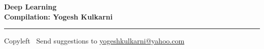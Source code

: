 
\graphicspath{{images/}}



\footnotesize


\begin{center}
\Large{\textbf{Deep Learning\\ Compilation: Yogesh Kulkarni}}  
\end{center}

\begin{multicols}{2}

\end{multicols}

\rule{\linewidth}{0.25pt}
\scriptsize
Copyleft \textcopyleft\  Send suggestions to 
\href{http://www.yogeshkulkarni.com}{yogeshkulkarni@yahoo.com}



